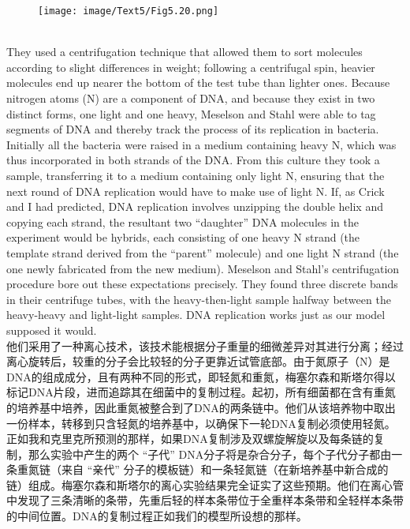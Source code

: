 \documentclass{article}
\begin{document}
\begin{figure}
    \centering
    \texttt{[image: image/Text5/Fig5.20.png]}
\end{figure}

\\
They used a centrifugation technique that allowed them to sort molecules according to slight differences in weight; following a centrifugal spin, heavier molecules end up nearer the bottom of the test tube than lighter ones. Because nitrogen atoms (N) are a component of DNA, and because they exist in two distinct forms, one light and one heavy, Meselson and Stahl were able to tag segments of DNA and thereby track the process of its replication in bacteria. Initially all the bacteria were raised in a medium containing heavy N, which was thus incorporated in both strands of the DNA. From this culture they took a sample, transferring it to a medium containing only light N, ensuring that the next round of DNA replication would have to make use of light N. If, as Crick and I had predicted, DNA replication involves unzipping the double helix and copying each strand, the resultant two “daughter” DNA molecules in the experiment would be hybrids, each consisting of one heavy N strand (the template strand derived from the “parent” molecule) and one light N strand (the one newly fabricated from the new medium). Meselson and Stahl’s centrifugation procedure bore out these expectations precisely. They found three discrete bands in their centrifuge tubes, with the heavy-then-light sample halfway between the heavy-heavy and light-light samples. DNA replication works just as our model supposed it would.\\
他们采用了一种离心技术，该技术能根据分子重量的细微差异对其进行分离；经过离心旋转后，较重的分子会比较轻的分子更靠近试管底部。由于氮原子（N）是DNA的组成成分，且有两种不同的形式，即轻氮和重氮，梅塞尔森和斯塔尔得以标记DNA片段，进而追踪其在细菌中的复制过程。起初，所有细菌都在含有重氮的培养基中培养，因此重氮被整合到了DNA的两条链中。他们从该培养物中取出一份样本，转移到只含轻氮的培养基中，以确保下一轮DNA复制必须使用轻氮。正如我和克里克所预测的那样，如果DNA复制涉及双螺旋解旋以及每条链的复制，那么实验中产生的两个 “子代” DNA分子将是杂合分子，每个子代分子都由一条重氮链（来自 “亲代” 分子的模板链）和一条轻氮链（在新培养基中新合成的链）组成。梅塞尔森和斯塔尔的离心实验结果完全证实了这些预期。他们在离心管中发现了三条清晰的条带，先重后轻的样本条带位于全重样本条带和全轻样本条带的中间位置。DNA的复制过程正如我们的模型所设想的那样。\\ 
\end{document}
